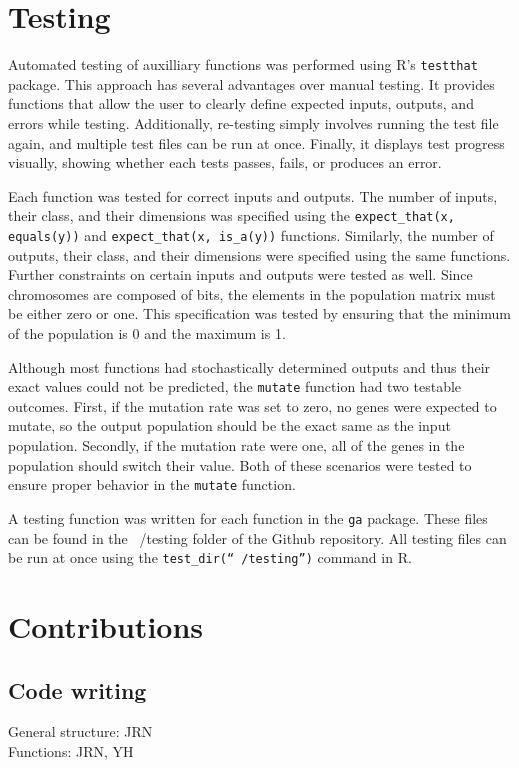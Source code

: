 \documentclass[11pt]{article}
\begin{document}
\section{Testing} 
\label{sec:testing}

Automated testing of auxilliary functions was performed using R's
\texttt{testthat} package. This approach has several advantages over
manual testing. It provides functions that allow the user to clearly
define expected inputs, outputs, and errors while
testing. Additionally, re-testing simply involves running the test file
again, and multiple test files can be run at once. Finally, it displays test progress visually, showing whether
each tests passes, fails, or produces an error.

Each function was tested for correct inputs and outputs. The number of
inputs, their class, and their dimensions was specified using the
\texttt{expect\_that(x, equals(y))} and \texttt{expect\_that(x,
  is\_a(y))} functions. Similarly, the number of outputs, their class,
and their dimensions were specified using the same
functions. Further constraints on certain inputs and outputs were tested as
well. Since chromosomes are composed of bits, the elements in the
population matrix must be either zero or one. This specification was
tested by ensuring that the minimum of the population is 0 and the
maximum is 1.

Although most functions had stochastically determined outputs and thus
their exact values could not be predicted, the \texttt{mutate}
function had two testable outcomes. First, if the mutation rate was
set to zero, no genes were expected to mutate, so the output
population should be the exact same as the input population. Secondly,
if the mutation rate were one, all of the genes in the population
should switch their value. Both of these scenarios were tested to
ensure proper behavior in the \texttt{mutate} function.

A testing function was written for each function in the \texttt{ga}
package. These files can be found in the ~/testing folder of the
Github repository. All testing files can be run at once using the
\texttt{test\_dir(``~/testing'')} command in R.

\section{Contributions} 
\label{sec:contributions}
\subsection{Code writing}
General structure: JRN\\
Functions: JRN, YH
\end{document}
